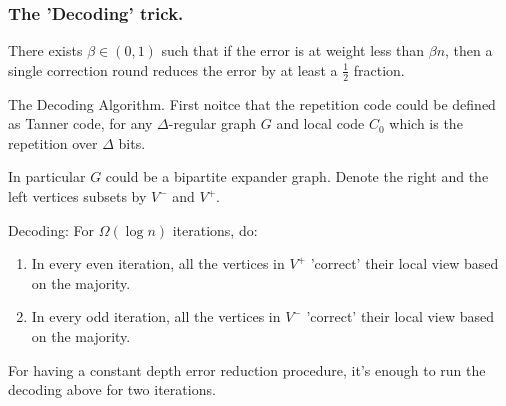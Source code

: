 \documentclass{beamer}
\begin{document}
\begin{frame}
  \frametitle{The 'Decoding' trick.} 
  
  \begin{lemma}
    \label{lemma:reduce}
There exists $\beta \in (0,1)$ such that if the error is at weight less than $\beta n$, then a single correction round reduces the error by at least a $\frac{1}{2}$ fraction.
  \end{lemma}



\end{frame}

\begin{frame}{The Decoding Algorithm.}
  First noitce that the repetition code could be defined as Tanner code, for any $\Delta$-regular graph $G$ and local code $C_{0}$ which is the repetition over $\Delta$ bits.   


  In particular $G$ could be a bipartite expander graph. Denote the right and the left vertices subsets by $V^{-}$ and $V^{+}$.
  \begin{block}{Decoding:}
    For $\Omega\left( \log n \right)$ iterations, do: 
  \begin{enumerate}
    \item In every even iteration, all the vertices in $V^{+}$ 'correct' their local view based on the majority.
    \item In every odd iteration, all the vertices in $V^{-}$ 'correct' their local view based on the majority.
  \end{enumerate}
For having a constant depth error reduction procedure, it's enough to run the decoding above for two iterations.
\end{block}

\end{frame}
\end{document}
